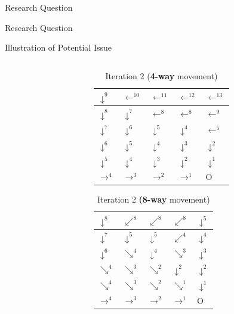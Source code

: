 \documentclass[xcolor=table, 9pt]{beamer}
\begin{document}
\begin{section}{Research Question}
\begin{frame}{Research Question}
\begin{block}{Illustration of Potential Issue}
\begin{columns}
\begin{column}{0.5\textwidth}
                
                \end{column}
                \begin{column}{0.5\textwidth}
\begin{table}[]
\begin{tabular}{|l|l|l|l|l|}
\hline
$\downarrow^9$ & $\leftarrow^{10}$ & $\leftarrow^{11}$ & $\leftarrow^{12}$   & $\leftarrow^{13}$ \\
\hline
$\downarrow^8$ & $\downarrow^{7}$  & $\leftarrow^{8}$   & $\leftarrow^{8}$     & $\leftarrow^{9}$   \\
\hline
$\downarrow^7$ & \cellcolor[HTML]{FD6864} $\downarrow^{6}$   & $\downarrow^{5}$   & $\downarrow^{4}$     & $\leftarrow^{5}$   \\
\hline
$\downarrow^6$ & $\downarrow^{5}$  & $\downarrow^{4}$   & $\downarrow^{3}$     & $\downarrow^{2}$   \\
\hline
$\downarrow^5$ & $\downarrow^{4}$  & $\downarrow^{3}$  & $\downarrow^{2}$    & $\downarrow^{1}$  \\
\hline
$\rightarrow^4$ & $\rightarrow^3$  & $\rightarrow^2$ & $\rightarrow^1$ & O \\
\hline
\end{tabular}
\caption{Iteration 2 (\textbf{4-way} movement)}
\end{table}       

\begin{table}[]
\begin{tabular}{|l|l|l|l|l|}
\hline
$\downarrow^8$ & $\swarrow^{8}$ & $\swarrow^{8}$ & $\swarrow^{8}$   & $\downarrow^{5}$ \\
\hline
$\downarrow^7$ & $\downarrow^{5}$  & $\downarrow^{5}$   & $\swarrow^{4}$     & $\downarrow^{4}$   \\
\hline
$\downarrow^6$ & $\searrow^{4}$   & $\downarrow^{4}$   & $\searrow^{3}$     & $\downarrow^{3}$   \\
\hline
$\searrow^4$ & $\searrow^{3}$  & $\searrow^{2}$   & $\downarrow^{2}$     & $\downarrow^{2}$   \\
\hline
$\searrow^4$ & $\searrow^{3}$  & $\searrow^{2}$  & $\searrow^{1}$    & $\downarrow^{1}$  \\
\hline
$\rightarrow^4$ & $\rightarrow^3$  & $\rightarrow^2$ & $\rightarrow^1$ & O \\
\hline
\end{tabular}
\caption{Iteration 2 \textbf{(8-way} movement)}
\end{table}    
                \end{column}
            \end{columns}
        \end{block}
    \end{frame}    
\end{section}
\end{document}
